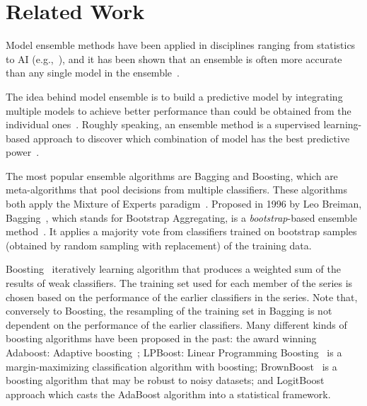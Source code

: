 \section{Related Work}
\label{sec-RelWork}
Model ensemble methods have been applied in disciplines ranging from statistics
to AI (e.g.,~\citep{breiman1996stacked,clemen1989combining,perrone1992soft,wolpert1992stacked}),
and it has been shown that an ensemble is often more accurate than any single
model in the ensemble~\citep{maclin2011popular}.

The idea behind model ensemble is to build a predictive model by integrating multiple models to achieve better performance than could be obtained from the individual ones~\citep{maclin2011popular,rokach2010ensemble}. Roughly speaking, an ensemble
method is a supervised learning-based approach to discover which combination of
model has the best predictive power~\citep{kuncheva2003measures}.

The most popular ensemble algorithms are Bagging and Boosting, which are meta-algorithms
that pool decisions from multiple classifiers. These algorithms both apply the Mixture
of Experts paradigm~\citep{brown2010ensemble}.
%
Proposed in 1996 by Leo Breiman, Bagging~\citep{breiman1996stacked}, which stands for
Bootstrap Aggregating, is a \textit{bootstrap}-based ensemble method~\citep{efron1994introduction}.
It applies a majority vote from classifiers trained on bootstrap samples (obtained by
random sampling with replacement) of the training data.

Boosting~\citep{freund1996experiments,schapire1990strength} iteratively learning
algorithm that produces a weighted sum of the results of weak classifiers. The
training set used for each member of the series is chosen based on the performance of
the earlier classifiers in the series. Note that, conversely to Boosting, the resampling
of the training set in Bagging is not dependent on the performance of the earlier classifiers.
Many different kinds of boosting algorithms have been proposed in the past: the
award winning Adaboost: Adaptive boosting~\citep{freund1996experiments}; LPBoost:
Linear Programming Boosting~\citep{demiriz2002linear} is a margin-maximizing classification
algorithm with boosting; BrownBoost~\cite{freund2001adaptive} is a boosting algorithm
that may be robust to noisy datasets; and LogitBoost~\cite{friedman2000additive} approach
which casts the AdaBoost algorithm into a statistical framework.

